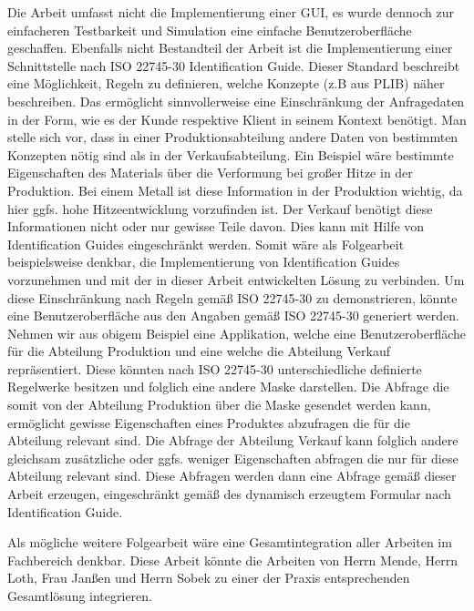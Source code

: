 Die Arbeit umfasst nicht die Implementierung einer GUI, es wurde dennoch zur einfacheren Testbarkeit und Simulation eine einfache Benutzeroberfläche geschaffen. Ebenfalls nicht Bestandteil der Arbeit ist die Implementierung einer Schnittstelle nach ISO 22745-30 Identification Guide. Dieser Standard beschreibt eine Möglichkeit, Regeln zu definieren, welche Konzepte (z.B aus \gls{PLIB}) näher beschreiben. Das ermöglicht sinnvollerweise eine Einschränkung der Anfragedaten in der Form, wie es der Kunde respektive Klient in seinem Kontext benötigt. Man stelle sich vor, dass in einer Produktionsabteilung andere Daten von bestimmten Konzepten nötig sind als in der Verkaufsabteilung. Ein Beispiel wäre bestimmte Eigenschaften des Materials über die Verformung bei großer Hitze in der Produktion. Bei einem Metall ist diese Information in der Produktion wichtig, da hier ggfs. hohe Hitzeentwicklung vorzufinden ist. Der Verkauf benötigt diese Informationen nicht oder nur gewisse Teile davon. Dies kann mit Hilfe von Identification Guides eingeschränkt werden. 
Somit wäre als Folgearbeit beispielsweise denkbar, die Implementierung von Identification Guides vorzunehmen und mit der in dieser Arbeit entwickelten Lösung zu verbinden. Um diese Einschränkung nach Regeln gemäß ISO 22745-30 zu demonstrieren, könnte eine Benutzeroberfläche aus den Angaben gemäß ISO 22745-30 generiert werden. Nehmen wir aus obigem Beispiel eine Applikation, welche eine Benutzeroberfläche für die Abteilung Produktion und eine welche die Abteilung Verkauf repräsentiert. Diese könnten nach ISO 22745-30 unterschiedliche definierte Regelwerke besitzen und folglich eine andere Maske darstellen. Die Abfrage die somit von der Abteilung Produktion über die Maske gesendet werden kann, ermöglicht gewisse Eigenschaften eines Produktes abzufragen die für die Abteilung relevant sind. Die Abfrage der Abteilung Verkauf kann folglich andere gleichsam zusätzliche oder ggfs. weniger Eigenschaften abfragen die nur für diese Abteilung relevant sind. Diese Abfragen werden dann eine Abfrage gemäß dieser Arbeit erzeugen, eingeschränkt gemäß des dynamisch erzeugtem Formular nach Identification Guide. 

Als mögliche weitere Folgearbeit wäre eine Gesamtintegration aller Arbeiten im Fachbereich denkbar. Diese Arbeit könnte die Arbeiten von Herrn Mende, Herrn Loth, Frau Janßen und Herrn Sobek zu einer der Praxis entsprechenden Gesamtlösung integrieren. 
  
